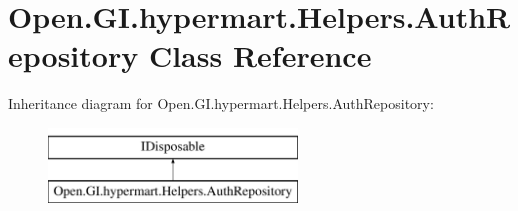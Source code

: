 \hypertarget{class_open_1_1_g_i_1_1hypermart_1_1_helpers_1_1_auth_repository}{}\section{Open.\+G\+I.\+hypermart.\+Helpers.\+Auth\+Repository Class Reference}
\label{class_open_1_1_g_i_1_1hypermart_1_1_helpers_1_1_auth_repository}


 


Inheritance diagram for Open.\+G\+I.\+hypermart.\+Helpers.\+Auth\+Repository\+:\begin{figure}[H]
\begin{center}
\leavevmode
\includegraphics[height=2.000000cm]{class_open_1_1_g_i_1_1hypermart_1_1_helpers_1_1_auth_repository}
\end{center}
\end{figure}
